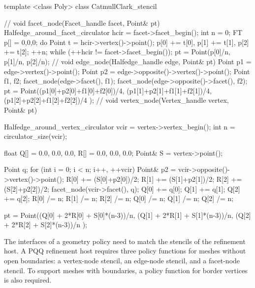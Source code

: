 \begin{ccExampleCode}
template <class Poly>
class CatmullClark_stencil {
  //
  void facet_node(Facet_handle facet, Point& pt) {
    Halfedge_around_facet_circulator hcir = facet->facet_begin();
    int n = 0;
    FT p[] = {0,0,0};
    do {
      Point t = hcir->vertex()->point();
      p[0] += t[0], p[1] += t[1], p[2] += t[2]; 
      ++n;
    } while (++hcir != facet->facet_begin());
    pt = Point(p[0]/n, p[1]/n, p[2]/n);
  }
  //
  void edge_node(Halfedge_handle edge, Point& pt) {
    Point p1 = edge->vertex()->point();
    Point p2 = edge->opposite()->vertex()->point();
    Point f1, f2;
    facet_node(edge->facet(), f1);
    facet_node(edge->opposite()->facet(), f2);
    pt = Point((p1[0]+p2[0]+f1[0]+f2[0])/4,
               (p1[1]+p2[1]+f1[1]+f2[1])/4,
               (p1[2]+p2[2]+f1[2]+f2[2])/4 );
  }
  //
  void vertex_node(Vertex_handle vertex, Point& pt) {
    Halfedge_around_vertex_circulator vcir = vertex->vertex_begin();
    int n = circulator_size(vcir);    

    float Q[] = {0.0, 0.0, 0.0}, R[] = {0.0, 0.0, 0.0};
    Point& S = vertex->point();
    
    Point q;
    for (int i = 0; i < n; i++, ++vcir) {
      Point& p2 = vcir->opposite()->vertex()->point();
      R[0] += (S[0]+p2[0])/2;
      R[1] += (S[1]+p2[1])/2;
      R[2] += (S[2]+p2[2])/2;
      facet_node(vcir->facet(), q);
      Q[0] += q[0];      
      Q[1] += q[1];      
      Q[2] += q[2];
    }
    R[0] /= n;    R[1] /= n;    R[2] /= n;
    Q[0] /= n;    Q[1] /= n;    Q[2] /= n;
      
    pt = Point((Q[0] + 2*R[0] + S[0]*(n-3))/n,
               (Q[1] + 2*R[1] + S[1]*(n-3))/n,
               (Q[2] + 2*R[2] + S[2]*(n-3))/n );
  }
}
\end{ccExampleCode}

The interfaces of a geometry policy need to match the stencils of 
the refinement host. A PQQ refinement host requires three 
policy functions for meshes without open boundaries: a vertex-node 
stencil, an edge-node stencil, and a facet-node stencil. 
To support meshes with boundaries, a policy function
for border vertices is also required.



